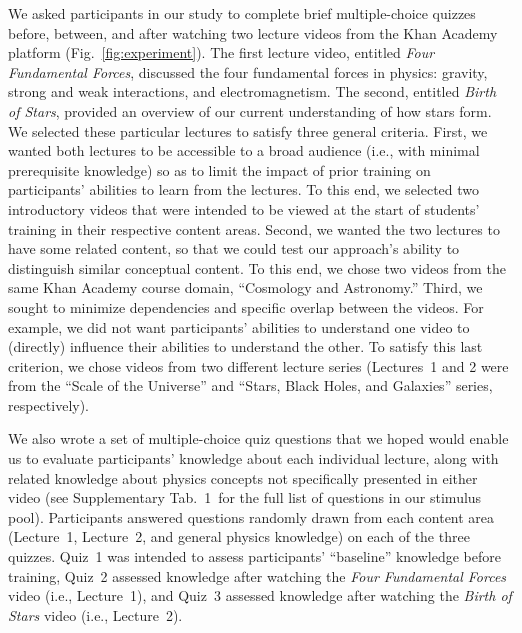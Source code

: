 \documentclass[10pt]{article}
\newcommand{\questions}{1}
\begin{document}
We asked participants in our study to complete brief multiple-choice quizzes
before, between, and after watching two lecture videos from the Khan
Academy~\citep{Khan04} platform (Fig.~\ref{fig:experiment}). The first lecture
video, entitled \textit{Four Fundamental Forces}, discussed the four
fundamental forces in physics: gravity, strong and weak interactions, and
electromagnetism. The second, entitled \textit{Birth of Stars}, provided an
overview of our current understanding of how stars form. We selected these
particular lectures to satisfy three general criteria. First, we wanted both
lectures to be accessible to a broad audience (i.e., with minimal prerequisite
knowledge) so as to limit the impact of prior training on participants'
abilities to learn from the lectures. To this end, we selected two introductory
videos that were intended to be viewed at the start of students' training in
their respective content areas. Second, we wanted the two lectures to have some
related content, so that we could test our approach's ability to distinguish
similar conceptual content. To this end, we chose two videos from the same
Khan Academy course domain, ``Cosmology and
Astronomy.'' Third, we sought to minimize dependencies and specific overlap
between the videos. For example, we did not want participants' abilities to
understand one video to (directly) influence their abilities to understand the
other. To satisfy this last criterion, we chose videos from two different
lecture series (Lectures~1 and 2 were from the ``Scale of the Universe'' and
``Stars, Black Holes, and Galaxies'' series, respectively).

We also wrote a set of multiple-choice quiz questions that we hoped would
enable us to evaluate participants' knowledge about each individual lecture,
along with related knowledge about physics concepts not specifically presented in either
video (see Supplementary Tab.~\questions~for the full list of questions in our stimulus
pool). Participants answered questions randomly drawn from each content area
(Lecture~1, Lecture~2, and general physics knowledge) on each of the three
quizzes. Quiz~1 was intended to assess participants' ``baseline'' knowledge
before training, Quiz~2 assessed knowledge after watching the \textit{Four
Fundamental Forces} video (i.e., Lecture~1), and Quiz~3 assessed knowledge
after watching the \textit{Birth of Stars} video (i.e., Lecture~2).
\end{document}

